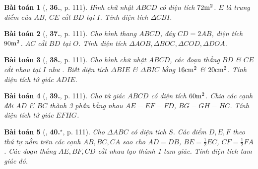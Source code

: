 \documentclass{article}
\numberwithin{equation}{section}
\newtheorem{baitoan}{Bài toán}[section]
\begin{document}
\begin{baitoan}[\cite{Binh_Toan_6_tap_1}, \textbf{36.}, p. 111]
	Hình chữ nhật $ABCD$ có diện tích $\rm 72m^2$. $E$ là trung điểm của $AB$, $CE$ cắt $BD$ tại $I$. Tính diện tích $\Delta CBI$.
\end{baitoan}

\begin{baitoan}[\cite{Binh_Toan_6_tap_1}, \textbf{37.}, p. 111]
	Cho hình thang $ABCD$, đáy $CD = 2AB$, diện tích $\rm 90m^2$. $AC$ cắt $BD$ tại $O$. Tính diện tích $\Delta AOB,\Delta BOC,\Delta COD,\Delta DOA$.
\end{baitoan}

\begin{baitoan}[\cite{Binh_Toan_6_tap_1}, \textbf{38.}, p. 111]
	Cho hình chữ nhật $ABCD$, các đoạn thẳng $BD$ \& $CE$ cắt nhau tại $I$ như \cite[Hình 51, p. 112]{Binh_Toan_6_tap_1}. Biết diện tích $\Delta BIE$ \& $\Delta BIC$ bằng $\rm16cm^2$ \& $\rm20cm^2$. Tính diện tích tứ giác $ADIE$.
\end{baitoan}

\begin{baitoan}[\cite{Binh_Toan_6_tap_1}, \textbf{39.}, p. 111]
	Cho tứ giác $ABCD$ có diện tích $\rm60m^2$. Chia các cạnh đối $AD$ \& $BC$ thành 3 phần bằng nhau $AE = EF = FD$, $BG = GH = HC$. Tính diện tích tứ giác $EFHG$.
\end{baitoan}

\begin{baitoan}[\cite{Binh_Toan_6_tap_1}, \textbf{40.}${}^\star$, p. 111]
	Cho $\Delta ABC$ có diện tích $S$. Các điểm $D,E,F$ theo thứ tự nằm trên các cạnh $AB,BC,CA$ sao cho $AD = DB$, $BE =  \frac{1}{2}EC$, $CF = \frac{1}{2}FA$. Các đoạn thẳng  $AE,BF,CD$ cắt nhau tạo thành 1 tam giác. Tính diện tích tam giác đó.
\end{baitoan}


\printbibliography[heading=bibintoc]
	
\end{document}
